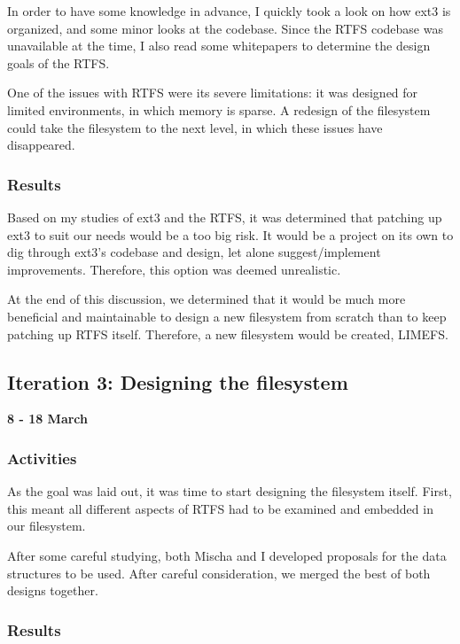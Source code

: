 In order to have some knowledge in advance, I quickly took a look on how ext3 is organized, and some minor looks at the codebase. Since the RTFS codebase was unavailable at the time, I also read some whitepapers to determine the design goals of the RTFS.

One of the issues with RTFS were its severe limitations: it was designed for limited environments, in which memory is sparse. A redesign of the filesystem could take the filesystem to the next level, in which these issues have disappeared.

\subsubsection{Results}

Based on my studies of ext3 and the RTFS, it was determined that patching up ext3 to suit our needs would be a too big risk. It would be a project on its own to dig through ext3's codebase and design, let alone suggest/implement improvements. Therefore, this option was deemed unrealistic.

At the end of this discussion, we determined that it would be much more beneficial and maintainable to design a new filesystem from scratch than to keep patching up RTFS itself. Therefore, a new filesystem would be created, LIMEFS.

\subsection{Iteration 3: Designing the filesystem}

\textbf{8 - 18 March}

\subsubsection{Activities}

As the goal was laid out, it was time to start designing the filesystem itself. First, this meant all different aspects of RTFS had to be examined and embedded in our filesystem.

After some careful studying, both Mischa and I developed proposals for the data structures to be used. After careful consideration, we merged the best of both designs together.

\subsubsection{Results}

